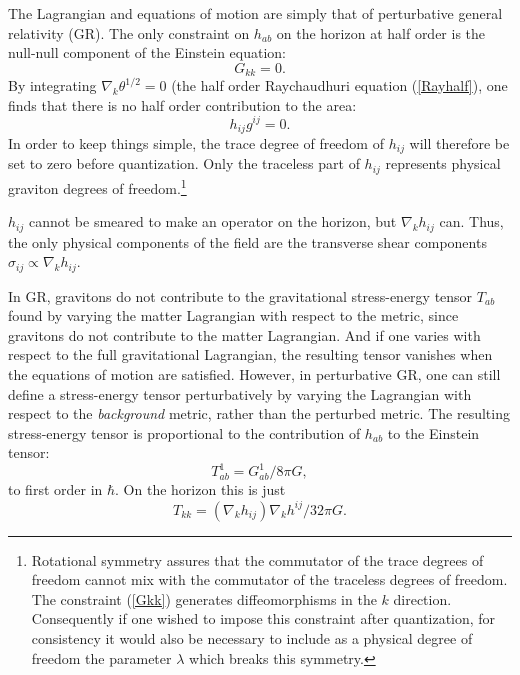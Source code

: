 \documentclass[12pt]{article}
\begin{document}
The Lagrangian and equations of motion are simply that of perturbative general relativity (GR).  The only constraint on $h_{ab}$ on the horizon at half order is the null-null component of the Einstein equation:
\begin{equation}\label{Gkk}
G_{kk} = 0.
\end{equation}
By integrating $\nabla_k \theta^{1/2} = 0$ (the half order Raychaudhuri equation (\ref{Rayhalf}), one finds that there is no half order contribution to the area:
\begin{equation}\label{freeze}
h_{ij} g^{ij} = 0.
\end{equation}
In order to keep things simple, the trace degree of freedom of $h_{ij}$ will therefore be set to zero before quantization.  Only the traceless part of $h_{ij}$ represents physical graviton degrees of freedom.\footnote{Rotational symmetry assures that the commutator of the trace degrees of freedom cannot mix with the commutator of the traceless degrees of freedom.  The constraint (\ref{Gkk}) generates diffeomorphisms in the $k$ direction.  Consequently if one wished to impose this constraint after quantization, for consistency it would also be necessary to include as a physical degree of freedom the parameter $\lambda$ which breaks this symmetry.}

$h_{ij}$ cannot be smeared to make an operator on the horizon, but $\nabla_k h_{ij}$ can.  Thus, the only physical components of the field are the transverse shear components $\sigma_{ij} \propto \nabla_k h_{ij}$.

In GR, gravitons do not contribute to the gravitational stress-energy tensor $T_{ab}$ found by varying the matter Lagrangian with respect to the metric, since gravitons do not contribute to the matter Lagrangian.  And if one varies with respect to the full gravitational Lagrangian, the resulting tensor vanishes when the equations of motion are satisfied.  However, in perturbative GR, one can still define a stress-energy tensor perturbatively by varying the Lagrangian with respect to the \emph{background} metric, rather than the perturbed metric.  The resulting stress-energy tensor is proportional to the contribution of $h_{ab}$ to the Einstein tensor:
\begin{equation}
T_{ab}^1 = G_{ab}^{1} / 8\pi G,
\end{equation}
to first order in $\hbar$.  On the horizon this is just
\begin{equation}\label{gravT}
T_{kk} = (\nabla_k h_{ij}) \nabla_k h^{ij} / 32\pi G.
\end{equation}
\end{document}
